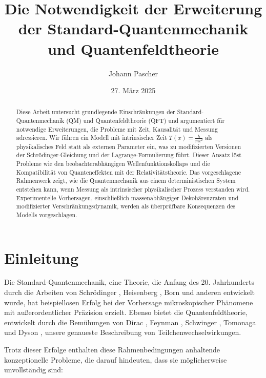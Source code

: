\documentclass[12pt,a4paper]{article}
\title{Die Notwendigkeit der Erweiterung der Standard-Quantenmechanik und Quantenfeldtheorie}
\author{Johann Pascher}
\date{27. März 2025}
\newcommand{\Tfield}{T(x)}
\begin{document}
	
	\maketitle
	
	\begin{abstract}
		Diese Arbeit untersucht grundlegende Einschränkungen der Standard-Quantenmechanik (QM) und Quantenfeldtheorie (QFT) und argumentiert für notwendige Erweiterungen, die Probleme mit Zeit, Kausalität und Messung adressieren. Wir führen ein Modell mit intrinsischer Zeit $\Tfield = \frac{\hbar}{mc^2}$ als physikalisches Feld statt als externen Parameter ein, was zu modifizierten Versionen der Schrödinger-Gleichung und der Lagrange-Formulierung führt. Dieser Ansatz löst Probleme wie den beobachterabhängigen Wellenfunktionskollaps und die Kompatibilität von Quanteneffekten mit der Relativitätstheorie. Das vorgeschlagene Rahmenwerk zeigt, wie die Quantenmechanik aus einem deterministischen System entstehen kann, wenn Messung als intrinsischer physikalischer Prozess verstanden wird. Experimentelle Vorhersagen, einschließlich massenabhängiger Dekohärenzraten und modifizierter Verschränkungsdynamik, werden als überprüfbare Konsequenzen des Modells vorgeschlagen.
	\end{abstract}
	
	\tableofcontents
	\newpage
	
	\section{Einleitung}
	\label{sec:introduction}
	
	Die Standard-Quantenmechanik, eine Theorie, die Anfang des 20. Jahrhunderts durch die Arbeiten von Schrödinger \cite{Schrodinger1926}, Heisenberg \cite{Heisenberg1925}, Born \cite{Born1926} und anderen entwickelt wurde, hat beispiellosen Erfolg bei der Vorhersage mikroskopischer Phänomene mit außerordentlicher Präzision erzielt. Ebenso bietet die Quantenfeldtheorie, entwickelt durch die Bemühungen von Dirac \cite{Dirac1927}, Feynman \cite{Feynman1949}, Schwinger \cite{Schwinger1948}, Tomonaga \cite{Tomonaga1946} und Dyson \cite{Dyson1949}, unsere genaueste Beschreibung von Teilchenwechselwirkungen.
	
	Trotz dieser Erfolge enthalten diese Rahmenbedingungen anhaltende konzeptionelle Probleme, die darauf hindeuten, dass sie möglicherweise unvollständig sind:
	
\end{document}

